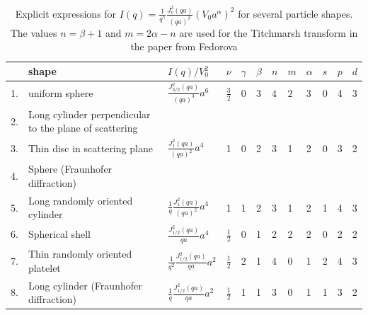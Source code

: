 \begin{table}[htb]
\centering
\caption{Explicit expressions for $\displaystyle I(q)=\frac{1}{q^\gamma}\frac{J_\nu^2(qa)}{(qa)^\beta} \left(V_0a^\alpha\right)^2$ for several particle shapes. The values $n=\beta+1$ and $m=2\alpha-n$ are used for the Titchmarsh transform in the paper from Fedorova}
\label{tab:gFF}
\begin{tabular}{|lL{5.5cm}|l|l|l|l|l|l|l|l|l|l|}
\toprule
& shape
             & $I(q)/V_0^2$  & $\nu$ & $\gamma$ & $\beta$ & $n$ & $m$     & $\alpha$ & $s$ & $p$ & $d$\\ .& uniform sphere
             & $\displaystyle \frac{J^2_{3/2}(qa)}{(qa)^3} a^6$     & $\frac32$ & 0 & 3 & $4$  & $2$    & 3 & 0 & 4 & 3\\
\parbox{0.3cm}{2.\newline\phantom{2.}}& Long cylinder perpendicular to
the plane of scattering
             &                                                       &            & & & & &          &   &   &   \\
3.& Thin disc in scattering  plane
             & $\displaystyle \frac{J^2_{1}(qa)}{(qa)^2} a^4$        & 1  & 0     & 2 & 3 & 1                      & 2 & 0 & 3 & 2 \\
\parbox{0.3cm}{4.\newline\phantom{4.}}& Sphere (Fraunhofer diffraction)
             &                                                       &            & & & & &           &   &   &  \\
\parbox{0.3cm}{5.\newline\phantom{5.}}  &Long randomly oriented cylinder
             & $\displaystyle \frac1q \frac{J^2_{1}(qa)}{(qa)^2} a^4$     & 1 & 1 & 2 & 3 & 1 & 2 & 1 & 4 & 3\\
6.& Spherical shell
             & $\displaystyle \frac{J^2_{1/2}(qa)}{qa} a^4$          & $\displaystyle\frac12$ & 0 & 1 & 2 & 2 & 2 & 0 & 2 & 2 \\
\parbox{0.3cm}{7.\newline\phantom{7.}}& Thin randomly oriented
platelet
             & $\displaystyle \frac{1}{q^2}\frac{J^2_{1/2}(qa)}{qa} a^2$ & $\displaystyle\frac12$ & 2 & 1 & 4 & 0 & 1 & 2 & 4 & 3 \\
\parbox{0.3cm}{8.\newline\phantom{8.}}& Long cylinder (Fraunhofer diffraction)
             & $\displaystyle \frac1q \frac{J^2_{1/2}(qa)}{qa} a^2$      & $\displaystyle\frac12$ & 1 & 1 & 3 & 0 & 1 & 1 & 3 & 2  \\

\end{tabular}
\end{table}
